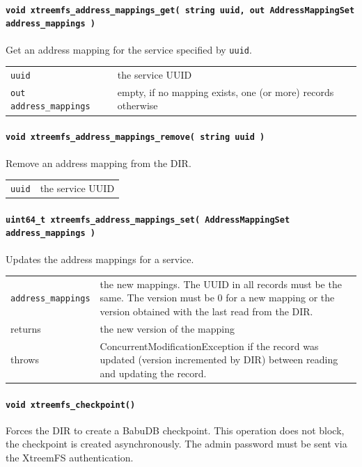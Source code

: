 \paragraph{\texttt{void xtreemfs\_address\_mappings\_get( string uuid, out AddressMappingSet address\_mappings~)}}
Get an address mapping for the service specified by \texttt{uuid}.

\begin{tabularx}{\textwidth}{lX}
 \texttt{uuid} & the service UUID\\
 \texttt{out address\_mappings} & empty, if no mapping exists, one (or more) records otherwise\\
\end{tabularx}


\paragraph{\texttt{void xtreemfs\_address\_mappings\_remove( string uuid~)}}
Remove an address mapping from the DIR.

\begin{tabularx}{\textwidth}{lX}
 \texttt{uuid} & the service UUID\\
\end{tabularx}


\paragraph{\texttt{uint64\_t xtreemfs\_address\_mappings\_set( AddressMappingSet address\_mappings~)}}
Updates the address mappings for a service. 

\begin{tabularx}{\textwidth}{lX}
 \texttt{address\_mappings} & the new mappings. The UUID in all records must be the same. The version must be 0 for a new mapping or the version obtained with the last read from the DIR\index{DIR}.\\
 returns & the new version of the mapping\\
 throws & ConcurrentModificationException if the record was updated (version incremented by DIR\index{DIR}) between reading and updating the record.
\end{tabularx}


\paragraph{\texttt{void xtreemfs\_checkpoint()}}
Forces the DIR to create a BabuDB checkpoint. This operation does not block, the checkpoint is created asynchronously. The admin password must be sent via the XtreemFS authentication.


